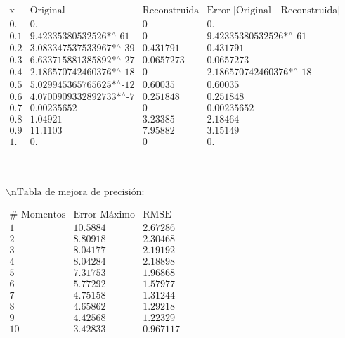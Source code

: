 \documentclass{article}
\begin{document}
\noindent\(\begin{array}{cccc}
 \text{x} & \text{Original} & \text{Reconstruida} & \text{Error $|$Original - Reconstruida$|$} \\
 0. & 0. & 0 & 0. \\
 0.1 & \text{9.42335380532526$\grave{ }$*${}^{\wedge}$-61} & 0 & \text{9.42335380532526$\grave{ }$*${}^{\wedge}$-61} \\
 0.2 & \text{3.083347537533967$\grave{ }$*${}^{\wedge}$-39} & 0.431791 & 0.431791 \\
 0.3 & \text{6.633715881385892$\grave{ }$*${}^{\wedge}$-27} & 0.0657273 & 0.0657273 \\
 0.4 & \text{2.186570742460376$\grave{ }$*${}^{\wedge}$-18} & 0 & \text{2.186570742460376$\grave{ }$*${}^{\wedge}$-18} \\
 0.5 & \text{5.029945365765625$\grave{ }$*${}^{\wedge}$-12} & 0.60035 & 0.60035 \\
 0.6 & \text{4.0700909332892733$\grave{ }$*${}^{\wedge}$-7} & 0.251848 & 0.251848 \\
 0.7 & 0.00235652 & 0 & 0.00235652 \\
 0.8 & 1.04921 & 3.23385 & 2.18464 \\
 0.9 & 11.1103 & 7.95882 & 3.15149 \\
 1. & 0. & 0 & 0. \\
\end{array}\)

\noindent\(\begin{array}{cc}
  &  \\
\end{array}\)

\noindent\(\text{$\backslash $nTabla de mejora de precisi{\' o}n:}\)

\begin{doublespace}
\noindent\(\begin{array}{ccc}
 \text{$\#$ Momentos} & \text{Error M{\' a}ximo} & \text{RMSE} \\
 1 & 10.5884 & 2.67286 \\
 2 & 8.80918 & 2.30468 \\
 3 & 8.04177 & 2.19192 \\
 4 & 8.04284 & 2.18898 \\
 5 & 7.31753 & 1.96868 \\
 6 & 5.77292 & 1.57977 \\
 7 & 4.75158 & 1.31244 \\
 8 & 4.65862 & 1.29218 \\
 9 & 4.42568 & 1.22329 \\
 10 & 3.42833 & 0.967117 \\
\end{array}\)
\end{doublespace}
\end{document}
